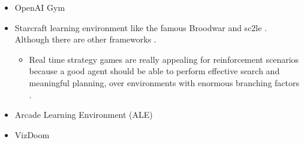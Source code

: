 
\begin{itemize}
\item OpenAI Gym \citep{Brockman2016}
\item Starcraft learning environment like the famous Broodwar \citep{Broodwar} and sc2le \citep{Vinyals2017}. Although there are other frameworks \citep{Synnaeve2016}.
    \begin{itemize}
    \item Real time strategy games are really appealing for reinforcement scenarios because a good agent should be able to perform effective search and meaningful planning, over environments with enormous branching factors \citep{Soemers2014}\citep{Wender2012}. 
    \end{itemize}
\item Arcade Learning Environment (ALE) \citep{Bellemare2015}
\item VizDoom \citep{Kempka2017}
\end{itemize}
